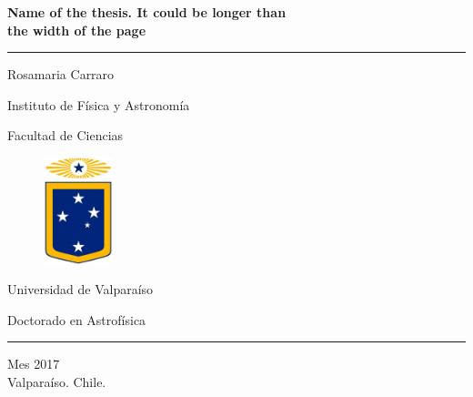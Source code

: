 \begin{titlepage}

\sffamily

\vspace{10mm}

\begin{centering}

{\huge \bfseries Name of the thesis. It could be longer than}\\
\vspace{0.2cm}
{\huge \bfseries the width of the page}

\vspace{2mm}

\noindent\rule{0.9\textwidth}{0.025truein}

\Large

\vspace{20mm}

{\sc Rosamaria Carraro}

\large

\vspace{15mm}
{Instituto de F\'isica y Astronom\'ia}

{Facultad de Ciencias}

\vspace{20mm}
\begin{figure}[h!]
\begin{center}
\includegraphics[width=2cm]{logo.jpeg}
\end{center}
\end{figure}
\vspace{10mm}

\large

{Universidad de Valpara\'iso}

{Doctorado en Astrof\'isica}

\vspace{10mm} \noindent\rule{1.5truein}{0.02truein}

{Mes 2017\\ Valpara\'iso. Chile.}

\end{centering}

\vfill

\end{titlepage}
\normalsize
